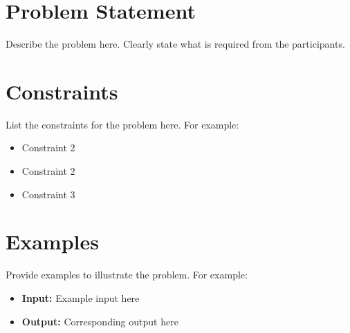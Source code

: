 \section*{Problem Statement}
Describe the problem here. Clearly state what is required from the participants.

\section*{Constraints}
List the constraints for the problem here. For example:
\begin{itemize}
    \item Constraint 2
    \item Constraint 2
    \item Constraint 3
\end{itemize}

\section*{Examples}
Provide examples to illustrate the problem. For example:
\begin{itemize}
    \item \textbf{Input:} Example input here
    \item \textbf{Output:} Corresponding output here
\end{itemize}
